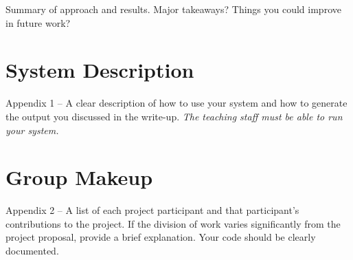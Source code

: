 \documentclass[11pt]{article}
\begin{document}
Summary of approach and results. Major takeaways? Things you could improve in future work?

\appendix

\section{System Description}

 Appendix 1 – A clear description of how to use your system and how to generate the output you discussed in the write-up. \emph{The teaching staff must be able to run your system.}

\section{Group Makeup}

 Appendix 2 – A list of each project participant and that
participant’s contributions to the project. If the division of work
varies significantly from the project proposal, provide a brief
explanation.  Your code should be clearly documented.





\end{document}
